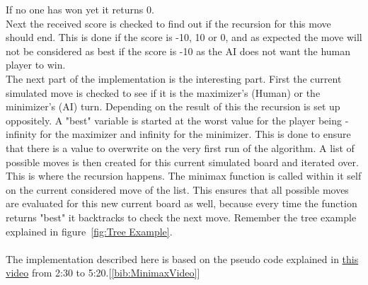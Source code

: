 If no one has won yet it returns 0.\\
Next the received score is checked to find out if the recursion for this move should end. This is done if the score is -10, 10 or 0, 
and as expected the move will not be considered as best 
if the score is -10 as the AI does not want the human player to win.\\
The next part of the implementation is the interesting part. First the current simulated move is checked to see if it is the maximizer's (Human) or the minimizer's (AI) turn. 
Depending on the result of this the recursion is set up oppositely. A "best" variable is started at the worst value for the player being 
-infinity for the maximizer and infinity for the minimizer. This is done to ensure that there is a value to overwrite on the very first run of the algorithm.
A list of possible moves is then created for this current simulated board and iterated over. This is where the recursion happens.
The minimax function is called within it self on the current considered move of the list. This ensures that all possible moves are evaluated for this new current board as well, 
because every time the function returns "best" it backtracks to check the next move. Remember the tree example explained in figure~\ref{fig:Tree Example}.\\\\
The implementation described here is based on the pseudo code explained in \href{https://www.youtube.com/watch?v=l-hh51ncgDI}{this video} from 2:30 to 5:20.[\ref{bib:MinimaxVideo}]
\clearpage